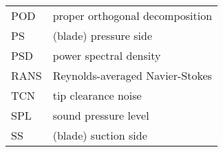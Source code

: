 \begin{tabular}{ll}
POD & proper orthogonal decomposition \\
PS & (blade) pressure side \\
PSD & power spectral density \\
RANS & Reynolds-averaged Navier-Stokes \\
TCN & tip clearance noise \\
SPL & sound pressure level \\
SS & (blade) suction side \\

\end{tabular}